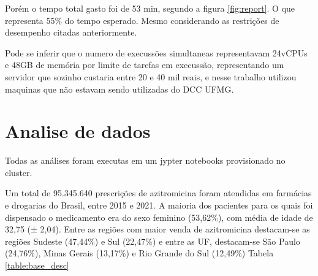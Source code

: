 Porém o tempo total gasto foi de 53 min, segundo a figura \ref{fig:report}. O que representa 55\% do tempo esperado. Mesmo considerando as restrições de desempenho citadas anteriormente.

Pode se inferir que o numero de execussões simultaneas representavam 24vCPUs e 48GB de memória por limite de tarefas em execussão, representando um servidor que sozinho custaria entre 20 e 40 mil reais, e nesse trabalho utilizou maquinas que não estavam sendo utilizadas do DCC UFMG.



\section{Analise de dados}
Todas as análises foram executas em um jypter notebooks provisionado no cluster.

Um total de 95.345.640 prescrições de azitromicina foram atendidas em farmácias e drogarias do Brasil, entre 2015 e 2021. A maioria dos pacientes para os quais foi dispensado o medicamento era do sexo feminino (53,62\%), com média de idade de 32,75 (± 2,04). Entre as regiões com maior venda de azitromicina destacam-se as regiões Sudeste (47,44\%) e Sul (22,47\%) e entre as UF, destacam-se São Paulo (24,76\%), Minas Gerais (13,17\%) e Rio Grande do Sul (12,49\%) Tabela \ref{table:base_desc}


